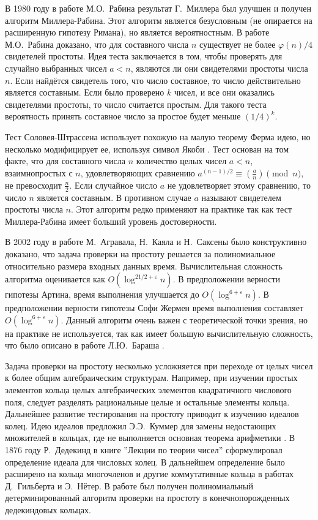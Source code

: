 \documentclass[_00_dissertation.tex]{subfiles}
\begin{document}
В 1980 году в работе М.О.~Рабина \cite{source:Rabin} результат Г.~Миллера был улучшен и получен алгоритм Миллера-Рабина.
Этот алгоритм является безусловным (не опирается на расширенную гипотезу Римана), но является вероятностным.
В работе М.О.~Рабина доказано, что для составного числа $n$ существует не более $\varphi(n)/4$ свидетелей простоты.
Идея теста заключается в том, чтобы проверять для случайно выбранных чисел $a < n$, являются ли они свидетелями простоты числа $n$.
Если найдётся свидетель того, что число составное, то число действительно является составным.
Если было проверено $k$ чисел, и все они оказались свидетелями простоты, то число считается простым.
Для такого теста вероятность принять составное число за простое будет меньше $(1/4)^{k}$.

Тест Соловея-Штрассена использует похожую на малую теорему Ферма идею, но несколько модифицирует ее, используя символ Якоби \cite{source:Solovay}.
Тест основан на том факте, что для составного числа $n$ количество целых чисел $a < n$, взаимнопростых с $n$, удовлетворяющих сравнению $a^{{(n-1)/2}}\equiv \left({\frac{a}{n}}\right){\pmod{n}}$, не превосходит $\frac{n}{2}$.
Если случайное число $a$ не удовлетворяет этому сравнению, то число $n$ является составным.
В противном случае $a$ называют свидетелем простоты числа $n$.
Этот алгоритм редко применяют на практике так как тест Миллера-Рабина имеет больший уровень достоверности.

В 2002 году в работе М.~Агравала, Н.~Каяла и Н.~Саксены \cite{source:AKS} было конструктивно доказано, что задача проверки на простоту решается за полиномиальное относительно размера входных данных время.
Вычислительная сложность алгоритма оценивается как $O(\log^{21/2 + \varepsilon} n)$.
В предположении верности гипотезы Артина, время выполнения улучшается до $O(\log^{6 + \varepsilon} n)$.
В предположении верности гипотезы Софи Жермен время выполнения составляет $O(\log^{6 + \varepsilon} n)$.
Данный алгоритм очень важен с теоретической точки зрения, но на практике не используется, так как имеет большую вычислительную сложность, что было описано в работе Л.Ю.~Бараша \cite{source:Barash}.

Задача проверки на простоту несколько усложняется при переходе от целых чисел к более общим алгебраическим структурам.
Например, при изучении простых элементов кольца целых алгебраических элементов квадратичного числового поля, следует разделять рациональные целые и остальные элементы кольца.
Дальнейшее развитие тестирования на простоту приводит к изучению идеалов колец.
Идею идеалов предложил Э.Э.~Куммер для замены недостающих множителей в кольцах, где не выполняется основная теорема арифметики \cite{source:Stillwell}.
В 1876 году Р.~Дедекинд в книге ''Лекции по теории чисел'' \cite{source:Dedekind} сформулировал определение идеала для числовых колец.
В дальнейшем определение было расширено на кольца многочленов и другие коммутативные кольца в работах Д.~Гильберта и Э.~Нётер.
В работе \cite{source:Huang_Prime_in_P} был получен полиномиальный детерминированный алгоритм проверки на простоту в конечнопорожденных дедекиндовых кольцах. 
\end{document}
